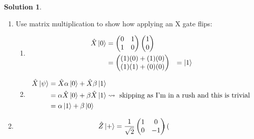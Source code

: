 \documentclass[10pt]{article}
\theoremstyle{definition}
\newtheorem{soln}{Solution}
\begin{document}
\begin{soln}~
  \begin{enumerate}[label=(\alph*)]
    \item Use matrix multiplication to show how applying an X gate flips:
          \begin{enumerate}[label=(\roman*)]
            \item \begin{align*}
                    \hat{X}\ket{0} & =
                    \begin{pmatrix}
                      0 & 1 \\
                      1 & 0
                    \end{pmatrix}
                    \begin{pmatrix}
                      1 \\
                      0
                    \end{pmatrix}             \\
                                   & =
                    \begin{pmatrix}
                      (1)(0)+(1)(0) \\
                      (1)(1)+(0)(0)
                    \end{pmatrix}
                                   & = \ket{1}
                  \end{align*}
            \item \begin{align*}
                    \hat{X}\ket{\psi} & = \hat{X}\alpha\ket{0}+\hat{X}\beta\ket{1}                                                                        \\
                                      & = \alpha\hat{X}\ket{0}+\beta\hat{X}\ket{1} \rightsquigarrow \text{ skipping as I'm in a rush and this is trivial} \\
                                      & = \alpha\ket{1}+\beta\ket{0}
                  \end{align*}
          \end{enumerate}
    \item \begin{align*}
            \hat{Z}\ket{+} & =
            \frac{1}{\sqrt{2}}
            \begin{pmatrix}
              1 & 0  \\
              0 & -1
            \end{pmatrix}
            \begin{pmatrix}

\end{pmatrix}
\end{align*}
\end{enumerate}
\end{soln}
\end{document}
